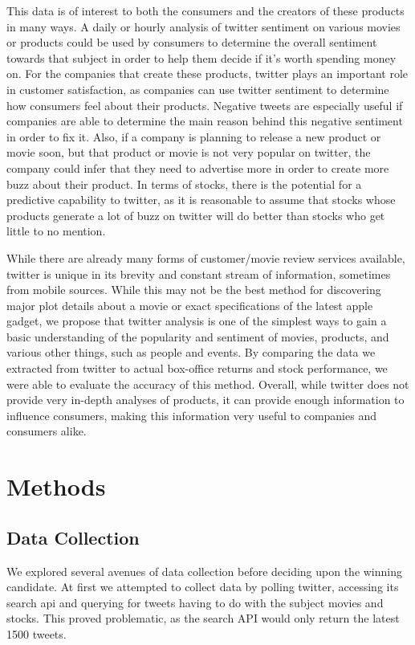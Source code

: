\documentclass[11pt]{article}
\begin{document}
This data is of interest to both the consumers and the creators of these products in many ways.  A daily or hourly analysis of twitter sentiment on various movies or products could be used by consumers to determine the overall sentiment towards that subject in order to help them decide if it's worth spending money on.  For the companies that create these products, twitter plays an important role in customer satisfaction, as companies can use twitter sentiment to determine how consumers feel about their products.\cite{go-distant}  Negative tweets are especially useful if companies are able to determine the main reason behind this negative sentiment in order to fix it.  Also, if a company is planning to release a new product or movie soon, but that product or movie is not very popular on twitter, the company could infer that they need to advertise more in order to create more buzz about their product.  In terms of stocks, there is the potential for a predictive capability to twitter, as it is reasonable to assume that stocks whose products generate a lot of buzz on twitter will do better than stocks who get little to no mention.

While there are already many forms of customer/movie review services available, twitter is unique in its brevity and constant stream of information, sometimes from mobile sources.  While this may not be the best method for discovering major plot details about a movie or exact specifications of the latest apple gadget, we propose that twitter analysis is one of the simplest ways to gain a basic understanding of the popularity and sentiment of movies, products, and various other things, such as people and events.  By comparing the data we extracted from twitter to actual box-office returns and stock performance, we were able to evaluate the accuracy of this method.  Overall, while twitter does not provide very in-depth analyses of products, it can provide enough information to influence consumers, making this information very useful to companies and consumers alike.

\section{Methods}


\subsection{Data Collection}
We explored several avenues of data collection before deciding upon the winning candidate. At first we attempted to collect data by polling twitter, accessing its search api  and querying for tweets having to do with the subject movies and stocks. This proved problematic, as the search API would only return the latest 1500 tweets.
\end{document}

